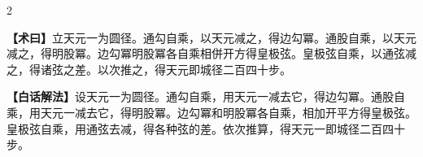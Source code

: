 \documentclass[11pt,a4paper]{article}
\newcommand{\WenMethod}{\textcolor{classicalcolor}{\textbf{【术曰】}}}
\newcommand{\BaiMethod}{\textcolor{moderncolor}{\textbf{【白话解法】}}}
\begin{document}
\begin{paracol}{2}
\switchcolumn*
\begin{tcolorbox}[colback=red!5,colframe=red!40!black,boxrule=0.3pt]
\WenMethod\quad 立天元一为圆径。通勾自乘，以天元减之，得边勾冪。通股自乘，以天元减之，得明股冪。边勾冪明股冪各自乘相併开方得皇极弦。皇极弦自乘，以通弦减之，得诸弦之差。以次推之，得天元即城径二百四十步。
\end{tcolorbox}
\switchcolumn
\begin{tcolorbox}[colback=blue!5,colframe=blue!40!black,boxrule=0.3pt]
\BaiMethod\quad 设天元一为圆径。通勾自乘，用天元一减去它，得边勾冪。通股自乘，用天元一减去它，得明股冪。边勾冪和明股冪各自乘，相加开平方得皇极弦。皇极弦自乘，用通弦去减，得各种弦的差。依次推算，得天元一即城径二百四十步。
\end{tcolorbox}

\end{paracol}

\vspace{0.5em}
\end{document}
